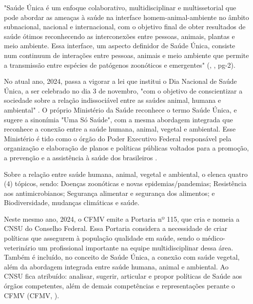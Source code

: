 \begin{citacao}
"Saúde Única é um enfoque colaborativo, multidisciplinar e multissetorial que pode abordar as ameaças à saúde na interface homem-animal-ambiente no âmbito subnacional, nacional e internacional, com o objetivo final de obter resultados de saúde ótimos reconhecendo as interconexões entre pessoas, animais, plantas e meio ambiente. Essa  interface, um aspecto definidor de Saúde Única, consiste num continuum de interações entre pessoas, animais e meio ambiente que permite a transmissão entre espécies de patógenos zoonóticos e emergentes" (\citeauthor{S1_OPAS_OMS}, \citeyear{S1_OPAS_OMS}, pg-2).
\end{citacao}


\indent No atual ano, 2024, passa a vigorar a lei que institui o Dia Nacional de Saúde Única, a ser celebrado no dia 3 de novembro, "com o objetivo de conscientizar a sociedade sobre a relação indissociável entre as saúdes animal, humana e ambiental" \cite{BRASIL2024LeiS1}. O próprio Ministério da Saúde reconhece o termo Saúde Única, e sugere a sinonímia "Uma Só Saúde", com a mesma abordagem integrada que reconhece a conexão entre a saúde humana, animal, vegetal e ambiental. Esse Ministério é tido como o órgão do Poder Executivo Federal responsável pela organização e elaboração de planos e políticas públicas voltados para a promoção, a prevenção e a assistência à saúde dos brasileiros \cite{MinisterioSaudeS1}.

\indent Sobre a relação entre saúde humana, animal, vegetal e ambiental, o  elenca quatro (4) tópicos, sendo: Doenças zoonóticas e novas epidemias/pandemias; Resistência aos antimicrobianos; Segurança alimentar e segurança dos alimentos; e Biodiversidade, mudanças climáticas e saúde.




\indent Neste mesmo ano, 2024, o \acrshort{CFMV} emite a Portaria nº 115, que cria e nomeia a \acrfull{CNSU} do Conselho Federal. Essa Portaria considera  a necessidade de criar políticas que assegurem à população qualidade em saúde, sendo o médico-veterinário um  profissional importante na equipe multidisciplinar dessa área. Também é incluído, no conceito de Saúde Única, a conexão com saúde vegetal, além da abordagem integrada entre saúde humana, animal e ambiental. Ao \acrshort{CNSU} fica atribuído: analisar, sugerir, articular e propor políticas de Saúde aos órgãos competentes, além de demais competências e representações perante o \acrshort{CFMV} (\acrlong{CFMV}, \citeyear{CFMV2024PORTARIA}).

